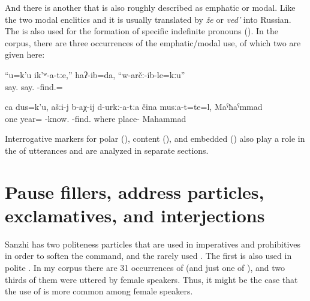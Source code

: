 And there is another   that is also roughly described as emphatic or modal. Like the two modal enclitics  and  it is usually translated by \textit{že} or \textit{ved'} into Russian. The  is also used for the formation of specific indefinite pronouns (). In the corpus, there are three occurrences of the emphatic/modal use, of which two are given here:
  
\begin{exe}
	\ex	\label{I said, ``You said that they did not find him.''}
	\gll	``u=k'u	ik'ʷ-a-tːe,''	haʔ-ib=da,	``w-arčː-ib-le=kːu'' \\
			say.	say.		-find.= \\
	\glt	{}
	
		\ex	\label{One year, you should know it, where the places were, Mahammad.}
	\gll	ca	dus=k'u,	ašːi-j	b-aχ-ij	d-urkː-a-tːa	čina	musːa-t=te=l,	Maˁħaˁmmad\\
		one	year=		-know.	-find.		where	place-	Mahammad\\
	\glt	{}

\end{exe}


Interrogative markers for polar  (), content  (), and embedded  () also play a role in the  of utterances and are analyzed in separate sections.



\section{Pause fillers, address particles, exclamatives, and interjections}
\label{sec:Pause fillers, address particles, exclamatives, and interjections}

Sanzhi has two politeness particles that are used in imperatives and prohibitives in order to soften the command,  and the rarely used . The first  is also used in polite  . In my corpus there are 31 occurrences of  (and just one of ), and two thirds of them were uttered by female speakers. Thus, it might be the case that the use of  is more common among female speakers.

